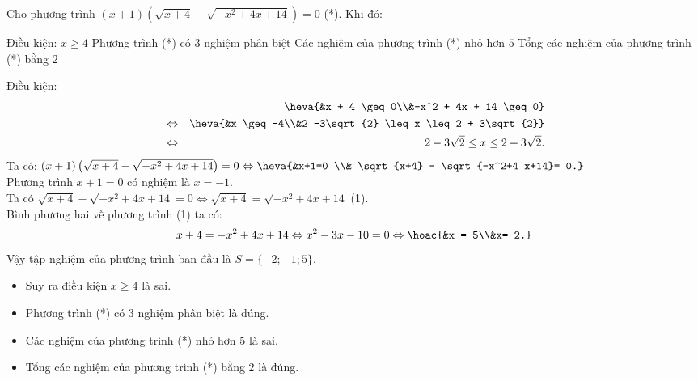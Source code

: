 \begin{ex}%
	Cho phương trình $(x + 1)\left(\sqrt{x+4}- \sqrt{-x^2+4 x+14}\right) = 0$ (*). Khi đó:
	
	\choiceTF
	{Điều kiện: $x \geq 4$}
	{\True Phương trình (*) có $3$ nghiệm phân biệt}
	{Các nghiệm của phương trình (*) nhỏ hơn $5$}
	{\True Tổng các nghiệm của phương trình (*) bằng $2$}
	\loigiai
	{Điều kiện: \begin{eqnarray*}
			& & \heva{&x + 4 \geq 0\\&-x^2 + 4x + 14 \geq 0}\\ 
			&\Leftrightarrow &  \heva{&x \geq -4\\&2 -3\sqrt{2} \leq x \leq 2 + 3\sqrt{2}}\\ &\Leftrightarrow &  2 -3\sqrt{2} \leq x \leq 2 + 3\sqrt{2}.\\
		\end{eqnarray*}
		Ta có: $(x+1)\left(\sqrt{x+4}-\sqrt{-x^2+4 x+14}\right)=0 \Leftrightarrow \heva{&x+1=0 \\& \sqrt{x+4} - \sqrt{-x^2+4 x+14}= 0.}$\\
		Phương trình $x+1=0$ có nghiệm là $x=-1$.\\
		Ta có $\sqrt{x+4}-\sqrt{-x^2+4 x+14}=0 \Leftrightarrow \sqrt{x+4}=\sqrt{-x^2+4 x+14}$ (1).\\
		Bình phương hai vế phương trình (1) ta có: 
		$$x+4=-x^2+4 x+14 \Leftrightarrow x^2-3 x-10=0 \Leftrightarrow \hoac{&x = 5\\&x=-2.}$$
		Vậy tập nghiệm của phương trình ban đầu là $S=\{-2 ;-1 ; 5\}$.
		\begin{itemize}
			\item Suy ra điều kiện $x \geq 4$ là sai.
			\item Phương trình (*) có $3$ nghiệm phân biệt là đúng.
			\item Các nghiệm của phương trình (*) nhỏ hơn $5$ là sai.
			\item Tổng các nghiệm của phương trình (*) bằng $2$ là đúng.
		\end{itemize}
	}
\end{ex}

